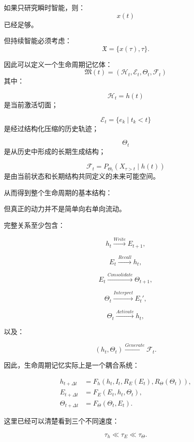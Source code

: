 如果只研究瞬时智能，则：
\[
x(t)
\]
已经足够。

但持续智能必须考虑：
\[
\mathfrak X
=
\{
x(\tau),\tau
\}.
\]

因此可以定义一个生命周期记忆体：
\[
\boxed{
\mathfrak M(t)
=
\left(
\mathcal H_t,
\mathcal E_t,
\Theta_t,
\mathcal F_t
\right)
}
\]
其中：

\[
\mathcal H_t
=
h(t)
\]
是当前激活切面；

\[
\mathcal E_t
=
\{e_k\mid t_k<t\}
\]
是经过结构化压缩的历史轨迹；

\[
\Theta_t
\]
是从历史中形成的长期生成结构；

\[
\mathcal F_t
=
P_{\Theta_t}
(
X_{\tau>t}\mid h(t)
)
\]
是由当前状态和长期结构共同定义的未来可能空间。

从而得到整个生命周期的基本结构：

\begin{statementbox}
\centering
{}
\end{statementbox}

但真正的动力并不是简单向右单向流动。

完整关系至少包含：

\[
h_t
\xrightarrow{Write}
E_{t+1},
\]

\[
E_t
\xrightarrow{Recall}
h_t,
\]

\[
E_t
\xrightarrow{Consolidate}
\Theta_{t+1},
\]

\[
\Theta_t
\xrightarrow{Interpret}
E_t',
\]

\[
\Theta_t
\xrightarrow{Activate}
h_t,
\]

以及：

\[
(h_t,\Theta_t)
\xrightarrow{Generate}
\mathcal F_t.
\]

因此，生命周期记忆实际上是一个耦合系统：

\begin{equation}
\boxed{
\begin{aligned}
h_{t+\Delta t}
&=
F_h
(
h_t,
I_t,
R_E(E_t),
R_\Theta(\Theta_t)
),\\
E_{t+\Delta t}
&=
F_E
(
E_t,
h_t,
\Theta_t
),\\
\Theta_{t+\Delta t}
&=
F_\Theta
(
\Theta_t,
E_t
).
\end{aligned}
}
\end{equation}

这里已经可以清楚看到三个不同速度：

\[
\tau_h
\ll
\tau_E
\ll
\tau_\Theta.
\]

